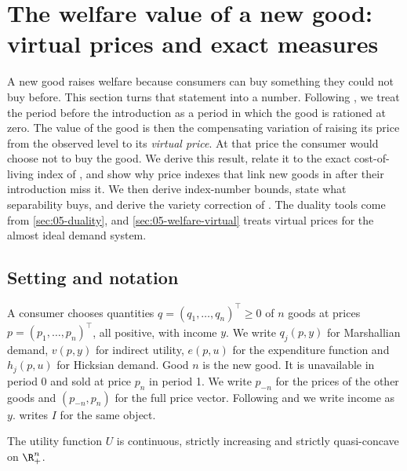 
\section{The welfare value of a new good: virtual prices and exact measures}\label{sec:10-virtual}

A new good raises welfare because consumers can buy something they could not buy before. This section turns
that statement into a number. Following \citet{Hicks1940}, we treat the period before the introduction as a
period in which the good is rationed at zero. The value of the good is then the compensating variation of
raising its price from the observed level to its \emph{virtual price}. At that price the consumer would
choose not to buy the good. We derive this result, relate it to the exact cost-of-living index of
\citet{Konus1939}, and show why price indexes that link new goods in after their introduction miss it. We
then derive index-number bounds, state what separability buys, and derive the variety correction of
\citet{Feenstra1994}. The duality tools come from \cref{sec:05-duality}, and \cref{sec:05-welfare-virtual}
treats virtual prices for the almost ideal demand system.

\subsection{Setting and notation}\label{sec:10-setting}

A consumer chooses quantities $q = (q_1,\dots,q_n)^\top \ge 0$ of $n$ goods at prices
$p = (p_1,\dots,p_n)^\top$, all positive, with income $y$. We write $q_j(p,y)$ for Marshallian demand,
$v(p,y)$ for indirect utility, $e(p,u)$ for the expenditure function and $h_j(p,u)$ for Hicksian demand.
Good $n$ is the new good. It is unavailable in period 0 and sold at price $p_n$ in period 1. We write
$p_{-n}$ for the prices of the other goods and $(p_{-n},p_n)$ for the full price vector. Following
\citet{Hausman1997} and \citet{Petrin2002} we write income as $y$.  writes $I$ for the same
object.

\begin{assumption}[Preferences]\label{ass:10-prefs}
The utility function $U$ is continuous, strictly increasing and strictly quasi-concave on $\R^n_+$.
\end{assumption}


